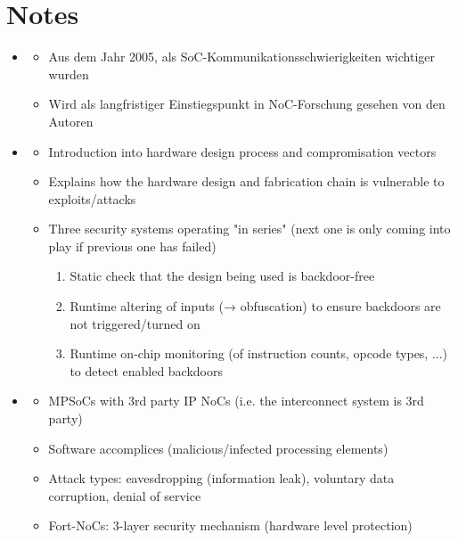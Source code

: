 \section{Notes}
\begin{itemize}
    \item \textbf{}
        \begin{itemize}
            \item Aus dem Jahr 2005, als SoC-Kommunikationsschwierigkeiten wichtiger wurden
            \item Wird als langfristiger Einstiegspunkt in NoC-Forschung gesehen von den Autoren
        \end{itemize}
    \item \textbf{}
        \begin{itemize}
            \item Introduction into hardware design process and compromisation vectors
            \item Explains how the hardware design and fabrication chain is vulnerable to exploits/attacks
            \item Three security systems operating "in series" (next one is only coming into play if previous one has failed)
                \begin{enumerate}
                    \item Static check that the design being used is backdoor-free
                    \item Runtime altering of inputs (→ obfuscation) to ensure backdoors are not triggered/turned on
                    \item Runtime on-chip monitoring (of instruction counts, opcode types, ...) to detect enabled backdoors
                \end{enumerate}
        \end{itemize}
    \item \textbf{}
        \begin{itemize}
            \item MPSoCs with 3rd party IP NoCs (i.e. the interconnect system is 3rd party)
            \item Software accomplices (malicious/infected processing elements)
            \item Attack types: eavesdropping (information leak), voluntary data corruption, denial of service
            \item Fort-NoCs: 3-layer security mechanism (hardware level protection)

\end{itemize}
\end{itemize}
